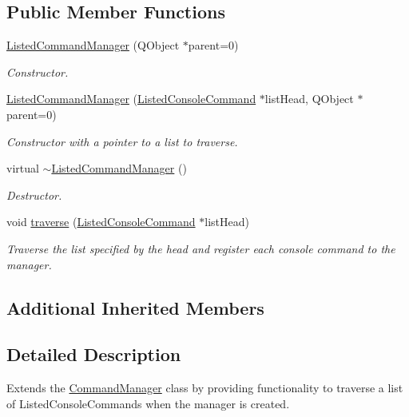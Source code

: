\subsection*{Public Member Functions}
\begin{DoxyCompactItemize}
\item 
\hyperlink{class_listed_command_manager_aeccd51549559c51c5e0e3b3e38c732e0}{Listed\-Command\-Manager} (Q\-Object $\ast$parent=0)
\begin{DoxyCompactList}\small\item\em Constructor. \end{DoxyCompactList}\item 
\hyperlink{class_listed_command_manager_a0d7559e6b7f8040dbcf58c6593e9f23c}{Listed\-Command\-Manager} (\hyperlink{class_listed_console_command}{Listed\-Console\-Command} $\ast$list\-Head, Q\-Object $\ast$parent=0)
\begin{DoxyCompactList}\small\item\em Constructor with a pointer to a list to traverse. \end{DoxyCompactList}\item 
\hypertarget{class_listed_command_manager_af3292a080af5bbc9c47c61cee213111b}{virtual \hyperlink{class_listed_command_manager_af3292a080af5bbc9c47c61cee213111b}{$\sim$\-Listed\-Command\-Manager} ()}\label{class_listed_command_manager_af3292a080af5bbc9c47c61cee213111b}

\begin{DoxyCompactList}\small\item\em Destructor. \end{DoxyCompactList}\item 
void \hyperlink{class_listed_command_manager_af10a37f7cd4adb7396e0a84f553aff21}{traverse} (\hyperlink{class_listed_console_command}{Listed\-Console\-Command} $\ast$list\-Head)
\begin{DoxyCompactList}\small\item\em Traverse the list specified by the head and register each console command to the manager. \end{DoxyCompactList}\end{DoxyCompactItemize}
\subsection*{Additional Inherited Members}


\subsection{Detailed Description}
Extends the \hyperlink{class_command_manager}{Command\-Manager} class by providing functionality to traverse a list of Listed\-Console\-Commands when the manager is created. 

